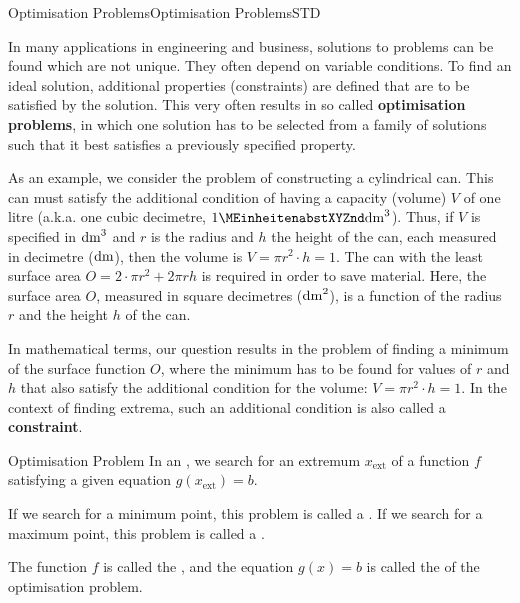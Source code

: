 \begin{MXContent}{Optimisation Problems}{Optimisation Problems}{STD}


In many applications in engineering and business, solutions to problems can be found which are not unique. 
They often depend on variable conditions. To find an ideal solution, additional properties (constraints)
are defined that are to be satisfied by the solution. This very often results in so called 
\textbf{optimisation problems}, in which one solution has to be selected from a family of solutions such that it 
best satisfies a previously specified property.

As an example, we consider the problem of constructing a cylindrical can. This can must satisfy the 
additional condition of having a capacity (volume) $V$ of one litre (a.k.a. one cubic decimetre, $1 \MEinheit{dm}^3$).
Thus, if $V$ is specified in $\MEinheit[]{dm}^3$ and $r$ is the radius and $h$ the height of the can, 
each measured in decimetre ($\MEinheit[]{dm}$), then the volume is $V = \pi r^2 \cdot h = 1$.
The can with the least surface area $O = 2 \cdot \pi r^2 + 2 \pi r h$ is required in order to save material.
Here, the surface area $O$, measured in square decimetres ($\MEinheit[]{dm}^2$), is a function of the 
radius $r$ and the height $h$ of the can. 

In mathematical terms, our question results in the problem of finding a minimum 
of the surface function $O$, where the minimum has to be found for values of $r$ and $h$ that also satisfy the 
additional condition for the volume: $V = \pi r^2 \cdot h = 1$. In the context of finding extrema, 
such an additional condition is also called a \textbf{constraint}.

\begin{MXInfo}{Optimisation Problem}
In an , we search for an 
extremum $x_{\text{ext}}$ of a function $f$ satisfying a given equation 
$g(x_{\text{ext}}) = b$.

If we search for a minimum point, this problem is called a . 
If we search for a maximum point, this problem is called a .  

The function $f$ is called the , and the equation $g(x) = b$
is called the  of the optimisation problem.
\end{MXInfo}
\end{MXContent}

